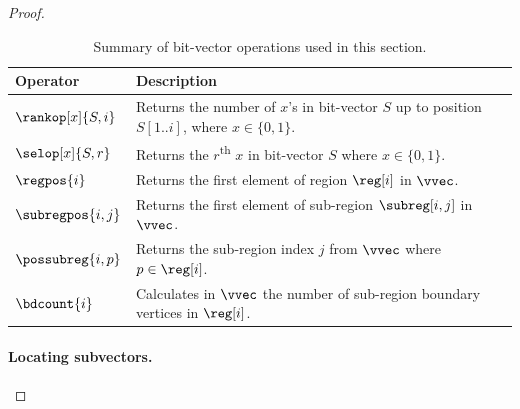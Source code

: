 \begin{proof}
\begin{table}[ht]
	\centering
		\begin{tabular}{ l | l}
			Operator & Description \\ \hline
			$\rankop[x]{S, i}$ & Returns the number of $x$'s in bit-vector $S$ up to
				position $S[1..i]$, where $x \in \{0,1\}$.\\
			$\selop[x]{S, r}$ & Returns the $r$\textsuperscript{th} $x$ in bit-vector $S$
				where $x \in \{0,1\}$.\\
			$\regpos{i}$ & Returns the first element of region $\reg[i]$ in $\vvec$. \\
			$\subregpos{i,j}$ & Returns the first element of sub-region $\subreg[i,j]$
				in $\vvec$. \\
			$\possubreg{i,p}$ & Returns the sub-region index $j$ from $\vvec$ where
				$p \in \reg[i]$. \\
			$\bdcount{i}$ & Calculates in $\vvec$ the number of sub-region boundary vertices
				in $\reg[i]$. \\ \hline
		\end{tabular}
	\caption{Summary of bit-vector operations used in this section. }
	\label{tab:succ_operators}
\end{table}

  \paragraph{Locating subvectors.}


\end{proof}

